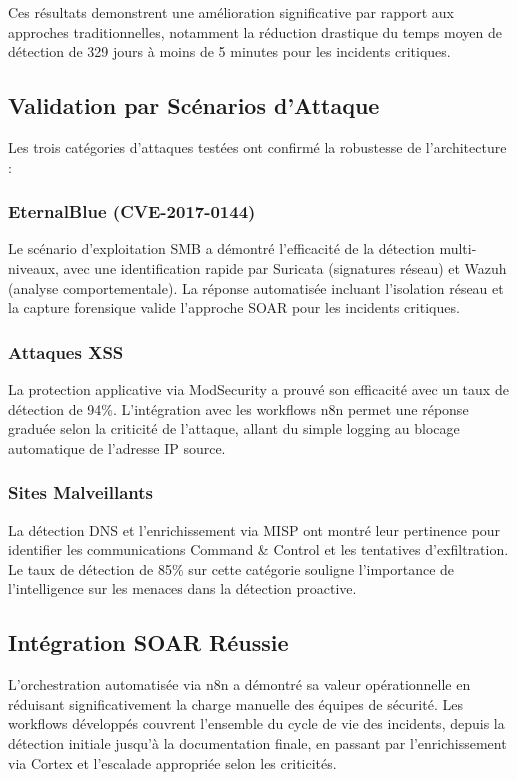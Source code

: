 Ces résultats demonstrent une amélioration significative par rapport aux approches traditionnelles, notamment la réduction drastique du temps moyen de détection de 329 jours à moins de 5 minutes pour les incidents critiques.

\subsection{Validation par Scénarios d'Attaque}

Les trois catégories d'attaques testées ont confirmé la robustesse de l'architecture :

\subsubsection{EternalBlue (CVE-2017-0144)}
Le scénario d'exploitation SMB a démontré l'efficacité de la détection multi-niveaux, avec une identification rapide par Suricata (signatures réseau) et Wazuh (analyse comportementale). La réponse automatisée incluant l'isolation réseau et la capture forensique valide l'approche SOAR pour les incidents critiques.

\subsubsection{Attaques XSS}
La protection applicative via ModSecurity a prouvé son efficacité avec un taux de détection de 94\%. L'intégration avec les workflows n8n permet une réponse graduée selon la criticité de l'attaque, allant du simple logging au blocage automatique de l'adresse IP source.

\subsubsection{Sites Malveillants}
La détection DNS et l'enrichissement via MISP ont montré leur pertinence pour identifier les communications Command \& Control et les tentatives d'exfiltration. Le taux de détection de 85\% sur cette catégorie souligne l'importance de l'intelligence sur les menaces dans la détection proactive.

\subsection{Intégration SOAR Réussie}

L'orchestration automatisée via n8n a démontré sa valeur opérationnelle en réduisant significativement la charge manuelle des équipes de sécurité. Les workflows développés couvrent l'ensemble du cycle de vie des incidents, depuis la détection initiale jusqu'à la documentation finale, en passant par l'enrichissement via Cortex et l'escalade appropriée selon les criticités.

